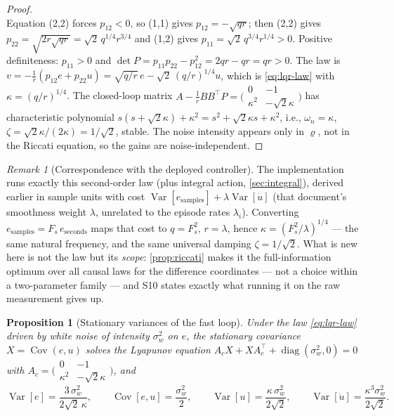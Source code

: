 \documentclass[11pt, a4paper]{article}
\theoremstyle{definition}
\theoremstyle{plain}
\newtheorem{proposition}[theorem]{Proposition}
\theoremstyle{remark}
\newtheorem{remark}{Remark}[section]
\newcommand{\Var}{\operatorname{Var}}
\newcommand{\Cov}{\operatorname{Cov}}
\begin{document}
\begin{proof}
\[\]
Equation (2,2) forces $p_{12} < 0$, so (1,1) gives
$p_{12} = -\sqrt{qr}$; then (2,2) gives
$p_{22} = \sqrt{2r\sqrt{qr}} = \sqrt2\, q^{1/4} r^{3/4}$ and (1,2) gives
$p_{11} = \sqrt2\, q^{3/4} r^{1/4} > 0$.  Positive definiteness:
$p_{11} > 0$ and
$\det P = p_{11}p_{22} - p_{12}^2 = 2qr - qr = qr > 0$.
The law is $v = -\tfrac1r(p_{12} e + p_{22} u)
= \sqrt{q/r}\,e - \sqrt2\,(q/r)^{1/4} u$, which is \cref{eq:lqr-law}
with $\kappa = (q/r)^{1/4}$.  The closed-loop matrix
$A - \tfrac1r BB^\top P
= \bigl(\begin{smallmatrix} 0&-1\\ \kappa^2& -\sqrt2\kappa
\end{smallmatrix}\bigr)$
has characteristic polynomial
$s(s+\sqrt2\kappa) + \kappa^2 = s^2 + \sqrt2\kappa s + \kappa^2$, i.e.,
$\omega_n = \kappa$, $\zeta = \sqrt2\kappa/(2\kappa) = 1/\sqrt2$,
stable.  The noise intensity appears only in $\varrho$, not in the Riccati
equation, so the gains are noise-independent.
\end{proof}

\begin{remark}[Correspondence with the deployed controller]
\label{rem:deployed}
The implementation runs exactly this second-order law (plus integral
action, \cref{sec:integral}), derived earlier in sample units with cost
$\Var[e_{\mathrm{samples}}] + \lambda \Var[\dot u]$ (that
document's smoothness weight $\lambda$, unrelated to the episode
rates $\lambda_i$).  Converting
$e_{\mathrm{samples}} = F_s\, e_{\mathrm{seconds}}$ maps that cost to
$q = F_s^2$, $r = \lambda$, hence
$\kappa = (F_s^2/\lambda)^{1/4}$ --- the same natural frequency, and the
same universal damping $\zeta = 1/\sqrt2$.  What is new here is not the
law but its \emph{scope}: \cref{prop:riccati} makes it the
full-information optimum over all causal laws for the difference
coordinates --- not a choice within a two-parameter family --- and S10
states exactly what running it on the raw measurement gives up.
\end{remark}

\begin{proposition}[Stationary variances of the fast loop]
\label{prop:lyapunov}
Under the law \cref{eq:lqr-law} driven by white noise of intensity
$\sigma_w^2$ on $e$, the stationary covariance
$X = \Cov(e,u)$ solves the Lyapunov equation
$A_c X + X A_c^\top + \operatorname{diag}(\sigma_w^2, 0) = 0$ with
$A_c = \bigl(\begin{smallmatrix} 0&-1\\ \kappa^2&-\sqrt2\kappa
\end{smallmatrix}\bigr)$, and
\begin{equation}\label{eq:lyapunov-values}
  \Var[e] = \frac{3\,\sigma_w^2}{2\sqrt2\,\kappa},
  \qquad
  \Cov[e,u] = \frac{\sigma_w^2}{2},
  \qquad
  \Var[u] = \frac{\kappa\,\sigma_w^2}{2\sqrt2},
  \qquad
  \Var[\dot u] = \frac{\kappa^3 \sigma_w^2}{2\sqrt2}.
\end{equation}
\end{proposition}
\end{document}
